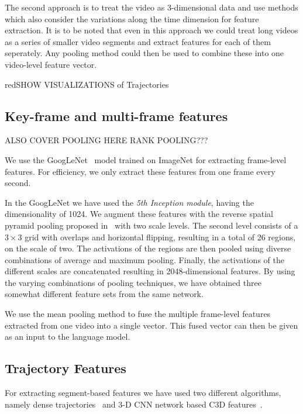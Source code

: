 The second approach is to treat the video as 3-dimensional data and
use methods which also consider the variations along the time
dimension for feature extraction.
It is to be noted that even in this approach we could treat long
videos as a series of smaller video segments and extract features for
each of them seperately.
Any pooling method could then be used to combine these into one
video-level feature vector.


red{SHOW VISUALIZATIONS of Trajectories}
\subsection{Key-frame and multi-frame features}
ALSO COVER POOLING HERE
RANK POOLING???

We use the GoogLeNet~\cite{DBLP:journals/corr/SzegedyLJSRAEVR14} model
trained on ImageNet for extracting frame-level features.
For efficiency, we only extract these features from one frame every
second. 

In the GoogLeNet we have used the \emph{5th Inception module}, having
the dimensionality of 1024.
We augment these features with the reverse spatial pyramid pooling
proposed in~\cite{Gong2014} with two scale levels.
The second level consists of a $3\times3$ grid with overlaps and
horizontal flipping, resulting in a total of 26 regions, on the scale
of two.
The activations of the regions are then pooled using diverse
combinations of average and maximum pooling.
Finally, the activations of the different scales are concatenated
resulting in 2048-dimensional features.
By using the varying combinations of pooling techniques, we have
obtained three somewhat different feature sets from the same network.

We use the mean pooling method to fuse the multiple frame-level
features extracted from one video into a single vector.
This fused vector can then be given as an input to the language model.

\subsection{Trajectory Features}

For extracting segment-based features we have used two different
algorithms, namely dense trajectories~\cite{DBLP:conf/cvpr/WangKSL11,
Wang2013} and 3-D CNN network based C3D features~\cite{DBLP:C3D}.

